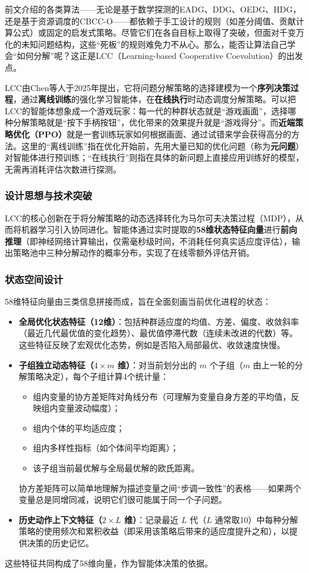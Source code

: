 前文介绍的各类算法——无论是基于数学探测的EADG、DDG、OEDG、HDG，还是基于资源调度的CBCC-O——都依赖于手工设计的规则（如差分阈值、贡献计算公式）或固定的启发式策略。尽管它们在各自目标上取得了突破，但面对千变万化的未知问题结构，这些“死板”的规则难免力不从心。那么，能否让算法自己学会“如何分解”呢？这正是LCC（Learning-based Cooperative Coevolution）的出发点。

LCC由Chen等人于2025年提出，它将问题分解策略的选择建模为一个\textbf{序列决策过程}，通过\textbf{离线训练}的强化学习智能体，在\textbf{在线执行}时动态调度分解策略。可以把LCC的智能体想象成一个游戏玩家：每一代的种群状态就是“游戏画面”，选择哪种分解策略就是“按下手柄按钮”，优化带来的效果提升就是“游戏得分”。而\textbf{近端策略优化（PPO）}就是一套训练玩家如何根据画面、通过试错来学会获得高分的方法。这里的“离线训练”指在优化开始前，先用大量已知的优化问题（称为\textbf{元问题}）对智能体进行预训练；“在线执行”则指在具体的新问题上直接应用训练好的模型，无需再消耗评估次数进行探测。

\subsubsection{设计思想与技术突破}
LCC的核心创新在于将分解策略的动态选择转化为马尔可夫决策过程（MDP），从而将机器学习引入协同进化。智能体通过实时提取的\textbf{58维状态特征向量}进行\textbf{前向推理}（即神经网络计算输出，仅需毫秒级时间，不消耗任何真实适应度评估），输出策略池中三种分解动作的概率分布，实现了在线零额外评估开销。

\subsubsection{状态空间设计}
58维特征向量由三类信息拼接而成，旨在全面刻画当前优化进程的状态：
\begin{itemize}
    \item \textbf{全局优化状态特征（12维）}：包括种群适应度的均值、方差、偏度、收敛斜率（最近几代最优值的变化趋势）、最优值停滞代数（连续未改进的代数）等。这些特征反映了宏观优化态势，例如是否陷入局部最优、收敛速度快慢。
    \item \textbf{子组独立动态特征（$4 \times m$ 维）}：对当前划分出的 $m$ 个子组（$m$ 由上一轮的分解策略决定），每个子组计算4个统计量：
        \begin{itemize}
            \item 组内变量的协方差矩阵对角线分布（可理解为变量自身方差的平均值，反映组内变量波动幅度）；
            \item 组内个体的平均适应度；
            \item 组内多样性指标（如个体间平均距离）；
            \item 该子组当前最优解与全局最优解的欧氏距离。
        \end{itemize}
        协方差矩阵可以简单地理解为描述变量之间“步调一致性”的表格——如果两个变量总是同增同减，说明它们很可能属于同一个子问题。
    \item \textbf{历史动作上下文特征（$2 \times L$ 维）}：记录最近 $L$ 代（$L$ 通常取10）中每种分解策略的使用频次和累积收益（即采用该策略后带来的适应度提升之和），以提供决策的历史记忆。
\end{itemize}
这些特征共同构成了58维向量，作为智能体决策的依据。

